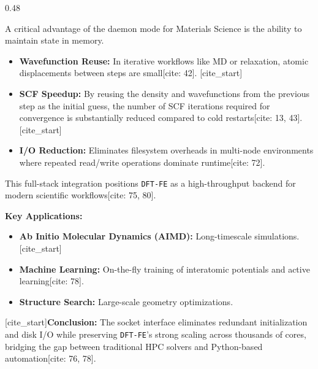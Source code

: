 \documentclass[serif,mathserif,final]{beamer}
\newcommand{\DFTFE}{\texttt{DFT-FE}}
\begin{document}
\begin{frame}[t]
\begin{columns}[t]
\begin{column}{0.48\paperwidth}
            \begin{tcolorbox}[title=Accelerating Convergence: Warm Starts]
                \justifying
                A critical advantage of the daemon mode for Materials Science is the ability to maintain state in memory.
                
                \begin{itemize}
                    [cite_start]\item \textbf{Wavefunction Reuse:} In iterative workflows like MD or relaxation, atomic displacements between steps are small[cite: 42].
                    [cite_start]\item \textbf{SCF Speedup:} By reusing the density and wavefunctions from the previous step as the initial guess, the number of SCF iterations required for convergence is substantially reduced compared to cold restarts[cite: 13, 43].
                    [cite_start]\item \textbf{I/O Reduction:} Eliminates filesystem overheads in multi-node environments where repeated read/write operations dominate runtime[cite: 72].
                \end{itemize}
            \end{tcolorbox}
            \vspace{1em}
            
            \begin{tcolorbox}[title=Impact \& Applications, colframe=accentred]
                This full-stack integration positions \DFTFE{} as a high-throughput backend for modern scientific workflows[cite: 75, 80].
                
                \textbf{Key Applications:}
                \begin{itemize}
                    \item \textbf{Ab Initio Molecular Dynamics (AIMD):} Long-timescale simulations.
                    [cite_start]\item \textbf{Machine Learning:} On-the-fly training of interatomic potentials and active learning[cite: 78].
                    \item \textbf{Structure Search:} Large-scale geometry optimizations.
                \end{itemize}
                
                [cite_start]\textbf{Conclusion:} The socket interface eliminates redundant initialization and disk I/O while preserving \DFTFE{}'s strong scaling across thousands of cores, bridging the gap between traditional HPC solvers and Python-based automation[cite: 76, 78].
            \end{tcolorbox}
            \vspace{1em}


\end{column}
\end{columns}
\end{frame}
\end{document}
